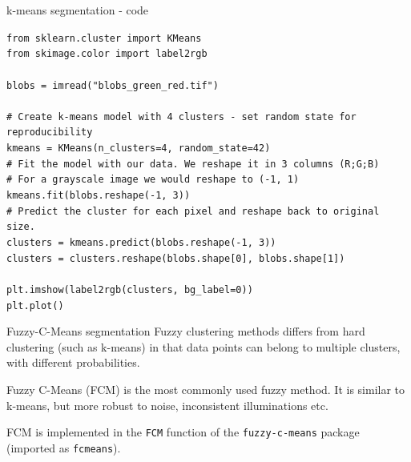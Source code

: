 \documentclass[9pt, aspectratio=169]{beamer}
\begin{document}
\begin{frame}
    {k-means segmentation - code}

    \begin{codebox}
        \texttt{from sklearn.cluster import KMeans\\
            from skimage.color import label2rgb\\
            \\
            blobs = imread("blobs\_green\_red.tif")\\
            \\
            \pause
            \# Create k-means model with 4 clusters - set random state for reproducibility\\
            kmeans = KMeans(n\_clusters=4, random\_state=42)\\
            \# Fit the model with our data. We reshape it in 3 columns (R;G;B)\\
            \# For a grayscale image we would reshape to (-1, 1)\\
            kmeans.fit(blobs.reshape(-1, 3))\\
            \# Predict the cluster for each pixel and reshape back to original size.\\
            clusters = kmeans.predict(blobs.reshape(-1, 3))\\
            clusters = clusters.reshape(blobs.shape[0], blobs.shape[1])\\
            \pause
            \\
            plt.imshow(label2rgb(clusters, bg\_label=0))\\
            plt.plot()
        }
    \end{codebox}
\end{frame}

\begin{frame}
    {Fuzzy-C-Means segmentation}
    Fuzzy clustering methods differs from hard clustering (such as k-means) in that data points can belong to multiple clusters, with different probabilities.

    Fuzzy C-Means (FCM) is the most commonly used fuzzy method. It is similar to k-means, but more robust to noise, inconsistent illuminations etc.

    FCM is implemented in the \texttt{FCM} function of the \texttt{fuzzy-c-means} package (imported as \texttt{fcmeans}).
\end{frame}
\end{document}
